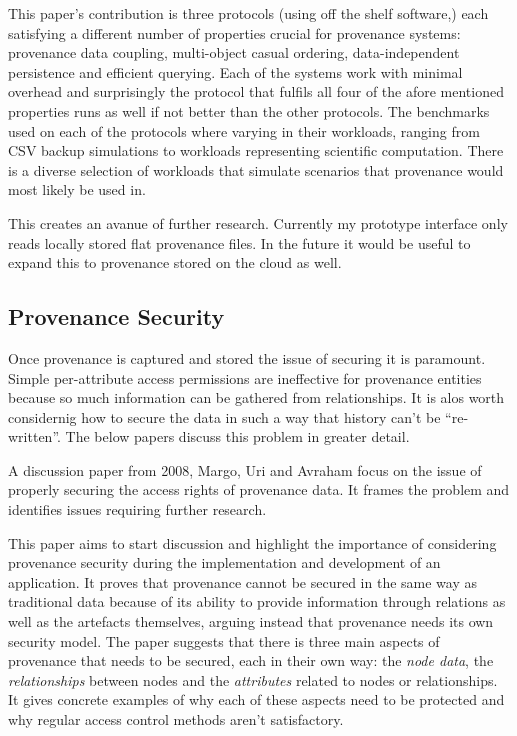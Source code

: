 This paper's contribution is three protocols (using off the shelf software,) each satisfying a different number of properties crucial for provenance systems: provenance data coupling, multi-object casual ordering, data-independent persistence and efficient querying. Each of the systems work with minimal overhead and surprisingly the protocol that fulfils all four of the afore mentioned properties runs as well if not better than the other protocols. The benchmarks used on each of the protocols where varying in their workloads, ranging from CSV backup simulations to workloads representing scientific computation. There is a diverse selection of workloads that simulate scenarios that provenance would most likely be used in.

This creates an avanue of further research. Currently my prototype interface only reads locally stored flat provenance files. In the future it would be useful to expand this to provenance stored on the cloud as well.

\subsection{Provenance Security}
\label{sec:provenance_security}

Once provenance is captured and stored the issue of securing it is paramount. Simple per-attribute access permissions are ineffective for provenance entities because so much information can be gathered from relationships. It is alos worth considernig how to secure the data in such a way that history can't be ``re-written''. The below papers discuss this problem in greater detail.

A discussion paper from 2008, Margo, Uri and Avraham focus on the issue of properly securing the access rights of provenance data. It frames the problem and identifies issues requiring further research.

This paper aims to start discussion and highlight the importance of considering provenance security during the implementation and development of an application. It proves that provenance cannot be secured in the same way as traditional data because of its ability to provide information through relations as well as the artefacts themselves, arguing instead that provenance needs its own security model. The paper suggests that there is three main aspects of provenance that needs to be secured, each in their own way: the \textit{node data}, the \textit{relationships} between nodes and the \textit{attributes} related to nodes or relationships. It gives concrete examples of why each of these aspects need to be protected and why regular access control methods aren't satisfactory.

